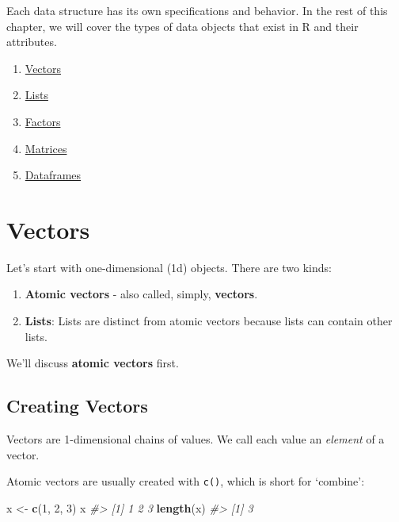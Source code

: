 \documentclass[]{book}
\newenvironment{Shaded}{\begin{snugshade}}{\end{snugshade}}
\newcommand{\CommentTok}[1]{\textcolor[rgb]{0.56,0.35,0.01}{\textit{#1}}}
\newcommand{\DecValTok}[1]{\textcolor[rgb]{0.00,0.00,0.81}{#1}}
\newcommand{\KeywordTok}[1]{\textcolor[rgb]{0.13,0.29,0.53}{\textbf{#1}}}
\newcommand{\NormalTok}[1]{#1}
\newcommand{\StringTok}[1]{\textcolor[rgb]{0.31,0.60,0.02}{#1}}
\providecommand{\tightlist}{%
  \setlength{\itemsep}{0pt}\setlength{\parskip}{0pt}}
\begin{document}
Each data structure has its own specifications and behavior. In the rest of this chapter, we will cover the types of data objects that exist in R and their attributes.

\begin{enumerate}
\def\labelenumi{\arabic{enumi}.}
\tightlist
\item
  \protect\hyperlink{vectors}{Vectors}
\item
  \protect\hyperlink{lists}{Lists}
\item
  \protect\hyperlink{factors}{Factors}
\item
  \protect\hyperlink{matrices}{Matrices}
\item
  \protect\hyperlink{dataframes}{Dataframes}
\end{enumerate}

\hypertarget{vectors}{%
\section{Vectors}\label{vectors}}

Let's start with one-dimensional (1d) objects. There are two kinds:

\begin{enumerate}
\def\labelenumi{\arabic{enumi}.}
\tightlist
\item
  \textbf{Atomic vectors} - also called, simply, \textbf{vectors}.
\item
  \textbf{Lists}: Lists are distinct from atomic vectors because lists can contain other lists.
\end{enumerate}

We'll discuss \textbf{atomic vectors} first.

\hypertarget{creating-vectors}{%
\subsection{Creating Vectors}\label{creating-vectors}}

Vectors are 1-dimensional chains of values. We call each value an \emph{element} of a vector.

Atomic vectors are usually created with \texttt{c()}, which is short for `combine':

\begin{Shaded}
\begin{Highlighting}[]
\NormalTok{x <-}\StringTok{ }\KeywordTok{c}\NormalTok{(}\DecValTok{1}\NormalTok{, }\DecValTok{2}\NormalTok{, }\DecValTok{3}\NormalTok{)}
\NormalTok{x}
\CommentTok{#> [1] 1 2 3}
\KeywordTok{length}\NormalTok{(x)}
\CommentTok{#> [1] 3}
\end{Highlighting}
\end{Shaded}
\end{document}
